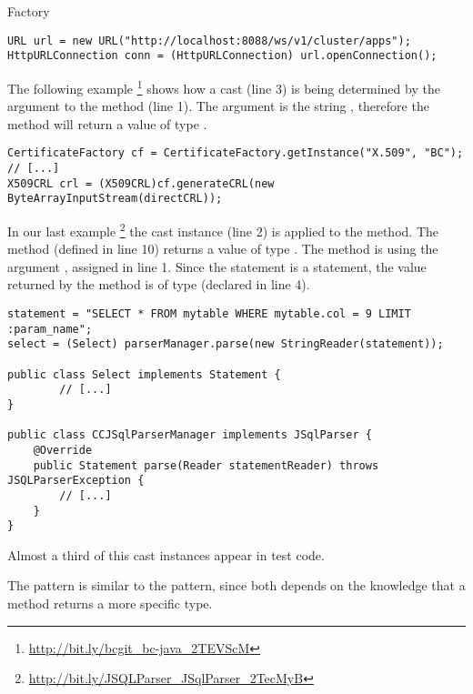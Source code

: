 \begin{pattern}{Factory}
\begin{verbatim}
URL url = new URL("http://localhost:8088/ws/v1/cluster/apps");
HttpURLConnection conn = (HttpURLConnection) url.openConnection();
\end{verbatim}

The following example%
\footnote{\url{http://bit.ly/bcgit_bc-java_2TEVScM}}
shows how a cast (line 3) is being determined by the argument to the  method (line 1).
The argument is the string ,
therefore the method  will return a value of type .

\begin{verbatim}
CertificateFactory cf = CertificateFactory.getInstance("X.509", "BC");
// [...]
X509CRL crl = (X509CRL)cf.generateCRL(new ByteArrayInputStream(directCRL));
\end{verbatim}

In our last example%
\footnote{\url{http://bit.ly/JSQLParser_JSqlParser_2TecMyB}}
the cast instance (line 2) is applied to the  method.
The  method (defined in line 10) returns a value of type .
The method is using the argument ,
assigned in line 1.
Since the statement is a  statement,
the value returned by the  method is of type 
(declared in line 4).

\begin{verbatim}
statement = "SELECT * FROM mytable WHERE mytable.col = 9 LIMIT :param_name";
select = (Select) parserManager.parse(new StringReader(statement));

public class Select implements Statement {
        // [...]
}

public class CCJSqlParserManager implements JSqlParser {
    @Override
    public Statement parse(Reader statementReader) throws JSQLParserException {
        // [...]
    }
}
\end{verbatim}


\detection{}

\discussion{}
Almost a third of this cast instances appear in test code.

\related{}
The  pattern is similar to the \thisp{} pattern,
since both depends on the knowledge that a method returns a more specific type.

\end{pattern}